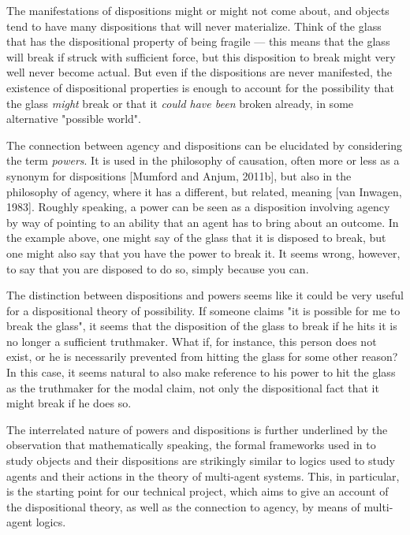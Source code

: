 \documentclass{article}
\begin{document}
The manifestations of dispositions might or might not come about, and objects tend to have many dispositions that will never materialize. Think of the glass that has the dispositional property of being fragile --- this means that the glass will break if struck with sufficient force, but this disposition to break might very well never become actual. But even if the dispositions are never manifested, the existence of dispositional properties is enough to account for the possibility that the glass \emph{might} break or that it \emph{could have been} broken already, in some alternative "possible world".

The connection between agency and dispositions can be elucidated by considering the term \emph{powers}. It is used in the philosophy of causation, often more or less as a
synonym for dispositions [Mumford and Anjum, 2011b], but also in the philosophy of
agency, where it has a different, but related, meaning [van Inwagen, 1983]. Roughly
speaking, a power can be seen as a disposition involving agency by way of pointing to
an ability that an agent has to bring about an outcome. In the example above, one
might say of the glass that it is disposed to break, but one might also say that
you have the power to break it. It seems wrong, however, to say that you are disposed to
do so, simply because you can.

The distinction between dispositions and powers seems like it could be very useful for a dispositional theory of possibility. If someone claims "it is possible for me to break the glass", it seems that the disposition of the glass to break if he hits it is no longer a sufficient truthmaker. What if, for instance, this person does not exist, or he is necessarily prevented from hitting the glass for some other reason? In this case, it seems natural to also make reference to his power to hit the glass as the truthmaker for the modal claim, not only the dispositional fact that it might break if he does so. 

The interrelated nature of powers and dispositions is further underlined by the observation that mathematically  speaking, the formal frameworks used in \cite{powmod,PhDpos} to study objects and their dispositions are strikingly similar to logics used to study agents and their actions in the theory of multi-agent systems. This, in particular, is the starting point for our technical project, which aims to give an account of the dispositional theory, as well as the connection to agency, by means of multi-agent logics.
\end{document}
